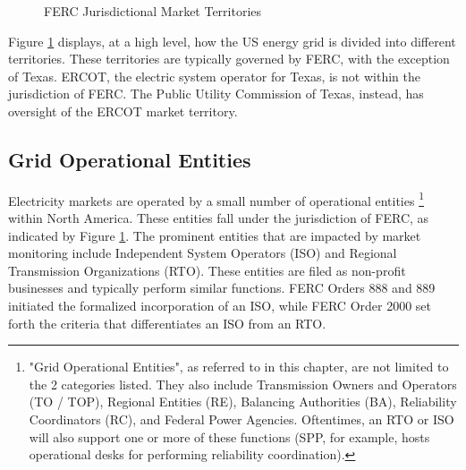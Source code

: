 \begin{figure}[ht]
\centering
{}
\caption{FERC Jurisdictional Market Territories}
\label{fig:gridmap}
\end{figure}

Figure \ref{fig:gridmap} \cite{ferc2} displays, at a high level, how the US energy grid is divided into different territories. These territories are typically governed by FERC, with the exception of Texas. ERCOT, the electric system operator for Texas, is not within the jurisdiction of FERC. The Public Utility Commission of Texas, instead, has oversight of the ERCOT market territory.

\subsection{Grid Operational Entities}
Electricity markets are operated by a small number of operational entities \footnote{"Grid Operational Entities", as referred to in this chapter, are not limited to the 2 categories listed. They also include Transmission Owners and Operators (TO / TOP), Regional Entities (RE), Balancing Authorities (BA), Reliability Coordinators (RC), and Federal Power Agencies. Oftentimes, an RTO or ISO will also support one or more of these functions (SPP, for example, hosts operational desks for performing reliability coordination).}
within North America. These entities fall under the jurisdiction of FERC, as indicated by Figure \ref{fig:gridmap}. The prominent entities that are impacted by market monitoring include Independent System Operators (ISO) and Regional Transmission Organizations (RTO). These entities are filed as non-profit businesses and typically perform similar functions. FERC Orders 888 and 889 initiated the formalized incorporation of an ISO, while FERC Order 2000 set forth the criteria that differentiates an ISO from an RTO.


